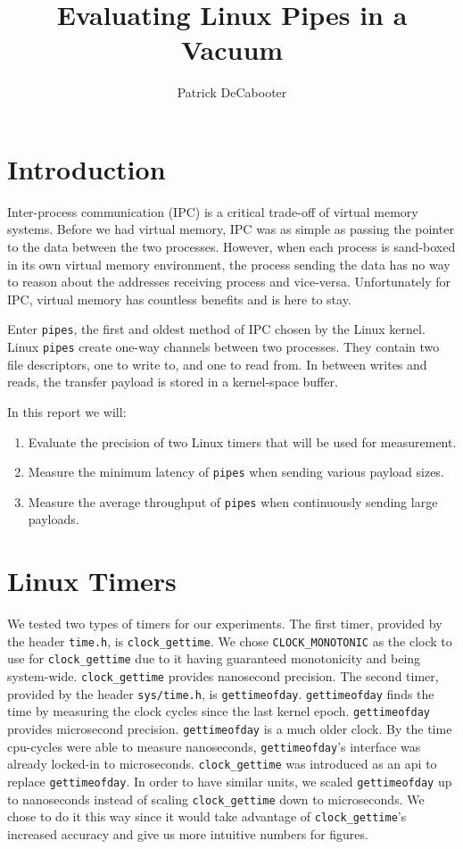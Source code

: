 \documentclass[11pt, twocolumn]{article}
\title{Evaluating Linux Pipes in a Vacuum}
\author{Patrick DeCabooter}
\date{}
\newcommand{\cgt}{\texttt{clock\_gettime}\xspace}
\newcommand{\gtod}{\texttt{gettimeofday}\xspace}
\newcommand{\pipes}{\texttt{pipes}\xspace}
\begin{document}
\maketitle

\section{Introduction}
Inter-process communication (IPC) is a critical trade-off of virtual memory systems.
Before we had virtual memory, IPC was as simple as passing the pointer to the data between the two processes. 
However, when each process is sand-boxed in its own virtual memory environment, the process sending
the data has no way to reason about the addresses receiving process and 
vice-versa. Unfortunately for IPC, virtual memory has countless benefits and is here
to stay.

Enter \pipes, the first and oldest method of IPC chosen by the Linux kernel. 
Linux \pipes create one-way channels between two processes. They contain two file descriptors,
one to write to, and one to read from. In between writes and reads, the transfer payload 
is stored in a kernel-space buffer.

In this report we will:
\begin{enumerate}[label=(\arabic*), nosep]
  \item Evaluate the precision of two Linux timers that will be used for measurement.
  \item Measure the minimum latency of \pipes when sending various payload sizes.
  \item Measure the average throughput of \pipes when continuously sending large payloads. 
\end{enumerate}

\section{Linux Timers}
We tested two types of timers for our experiments. 
The first timer, provided by the header \texttt{time.h}, is \cgt.
We chose \texttt{CLOCK\_MONOTONIC} as the clock to use for \cgt due 
to it having guaranteed monotonicity and being system-wide. 
\cgt provides nanosecond precision.
The second timer, provided by the header \texttt{sys/time.h}, is \gtod.
\gtod finds the time by measuring the clock cycles since the last kernel epoch.
\gtod provides microsecond precision.
\gtod is a much older clock. By the time cpu-cycles were able to measure nanoseconds,
\gtod's interface was already locked-in to microseconds. \cgt was introduced as an api to replace \gtod.
In order to have similar units, we scaled \gtod up to nanoseconds instead of scaling \cgt
down to microseconds. 
We chose to do it this way since it would take advantage of \cgt's
increased accuracy and give us more intuitive numbers for figures.
\end{document}
